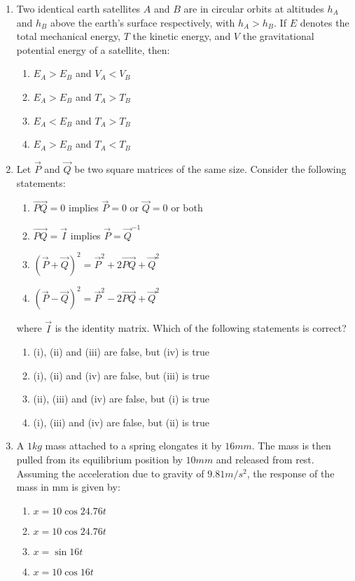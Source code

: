 \documentclass[journal]{IEEEtran}
\begin{document}
\begin{enumerate}
    \item Two identical earth satellites $A$ and $B$ are in circular orbits at altitudes $h_A$
    and $h_B$ above the earth's surface respectively, with $h_A > h_B$. If $E$ denotes the total
    mechanical energy, $T$ the kinetic energy, and $V$ the gravitational potential energy of a
    satellite, then:
    \begin{multicols}{2}
        \begin{enumerate}
            \item $E_A > E_B$ and $V_A < V_B$
            \item $E_A > E_B$ and $T_A > T_B$
            \item $E_A < E_B$ and $T_A > T_B$
            \item $E_A > E_B$ and $T_A < T_B$
        \end{enumerate}
    \end{multicols}

    \item Let $\vec{P}$ and $\vec{Q}$ be two square matrices of the same size. Consider the following statements:
    \begin{enumerate}[label=(\roman*)]
        \item $\vec{PQ} = 0$ implies $\vec{P} = 0$ or $\vec{Q} = 0$ or both
        \item $\vec{PQ} = \vec{I}$ implies $\vec{P} = \vec{Q}^{-1}$
        \item $(\vec{P} + \vec{Q})^2 = \vec{P}^2 + 2\vec{PQ} + \vec{Q}^2$
        \item $(\vec{P} - \vec{Q})^2 = \vec{P}^2 - 2\vec{PQ} + \vec{Q}^2$
    \end{enumerate}
    where $\vec{I}$ is the identity matrix. Which of the following statements is correct?
    \begin{enumerate}
        \item (i), (ii) and (iii) are false, but (iv) is true
        \item (i), (ii) and (iv) are false, but (iii) is true
        \item (ii), (iii) and (iv) are false, but (i) is true
        \item (i), (iii) and (iv) are false, but (ii) is true
    \end{enumerate}

    \item A $1 kg$ mass attached to a spring elongates it by $16 mm$. The mass is then pulled from its
    equilibrium position by $10 mm$ and released from rest. Assuming the acceleration due to gravity
    of $9.81 m/s^2$, the response of the mass in mm is given by:
    \begin{multicols}{2}
        \begin{enumerate}
            \item $x = 10 \cos 24.76t$
            \item $x = 10 \cos 24.76t$
            \item $x = \sin 16t$
            \item $x = 10 \cos 16t$
        \end{enumerate}
    \end{multicols}


\end{enumerate}
\end{document}
